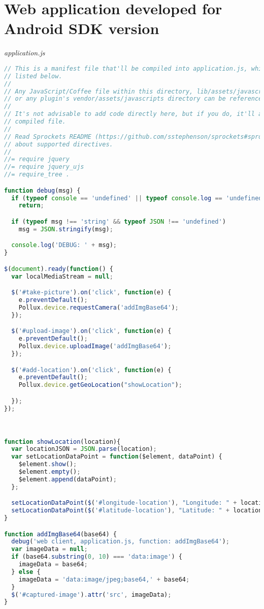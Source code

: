 \newpage

\section{Web application developed for Android SDK version} \label{App:AppendixC}
\emph{application.js}
\begin{lstlisting}[language=JavaScript]
// This is a manifest file that'll be compiled into application.js, which will include all the files
// listed below.
//
// Any JavaScript/Coffee file within this directory, lib/assets/javascripts, vendor/assets/javascripts,
// or any plugin's vendor/assets/javascripts directory can be referenced here using a relative path.
//
// It's not advisable to add code directly here, but if you do, it'll appear at the bottom of the
// compiled file.
//
// Read Sprockets README (https://github.com/sstephenson/sprockets#sprockets-directives) for details
// about supported directives.
//
//= require jquery
//= require jquery_ujs
//= require_tree .

function debug(msg) {
  if (typeof console == 'undefined' || typeof console.log == 'undefined')
    return;

  if (typeof msg !== 'string' && typeof JSON !== 'undefined')
    msg = JSON.stringify(msg);

  console.log('DEBUG: ' + msg);
}

$(document).ready(function() {
  var localMediaStream = null;

  $('#take-picture').on('click', function(e) {
    e.preventDefault();
    Pollux.device.requestCamera('addImgBase64');
  });

  $('#upload-image').on('click', function(e) {
    e.preventDefault();
    Pollux.device.uploadImage('addImgBase64');
  });

  $('#add-location').on('click', function(e) {
    e.preventDefault();
    Pollux.device.getGeoLocation("showLocation");

  });
});



function showLocation(location){
  var locationJSON = JSON.parse(location);
  var setLocationDataPoint = function($element, dataPoint) {
    $element.show();
    $element.empty();
    $element.append(dataPoint);
  };

  setLocationDataPoint($('#longitude-location'), "Longitude: " + locationJSON.longitude);
  setLocationDataPoint($('#latitude-location'), "Latitude: " + locationJSON.latitude);
}

function addImgBase64(base64) {
  debug('web client, application.js, function: addImgBase64');
  var imageData = null;
  if (base64.substring(0, 10) === 'data:image') {
    imageData = base64;
  } else {
    imageData = 'data:image/jpeg;base64,' + base64;
  }
  $('#captured-image').attr('src', imageData);
}
\end{lstlisting}
